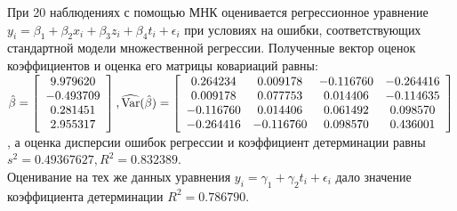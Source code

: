 \documentclass[addpoints, answers]{exam} %
\begin{document}
\begin{questions}
\begin{parts}
\end{parts}
\question При 20 наблюдениях с помощью МНК оценивается регрессионное уравнение $y_i=\beta_1+\beta_2 x_i+\beta_3 z_i+\beta_4 t_i+\epsilon_i$ при условиях на ошибки, соответствующих стандартной модели множественной регрессии. Полученные вектор оценок коэффициентов и оценка его матрицы ковариаций равны:\\
$\hat{\beta}=\left[ \begin{array}{c}
9.979620\\
-0.493709\\
0.281451\\
2.955317
\end{array}\right],
\widehat{\operatorname{Var}}(\hat{\beta})=\left[\begin{array}{cccc}
0.264234 & 0.009178 & -0.116760 & -0.264416\\
0.009178 & 0.077753 & 0.014406 & -0.114635\\
-0.116760 & 0.014406 & 0.061492 & 0.098570\\
-0.264416 & -0.116760 & 0.098570 & 0.436001
\end{array}\right]$\\, а оценка дисперсии ошибок регрессии и коэффициент детерминации равны $s^2=0.49367627, R^2=0.832389$.\\ 
Оценивание на тех же данных уравнения $y_i=\gamma_1+\gamma_2 t_i+\epsilon_i$ дало значение коэффициента детерминации $R^2=0.786790$.
\end{questions}
\end{document}
